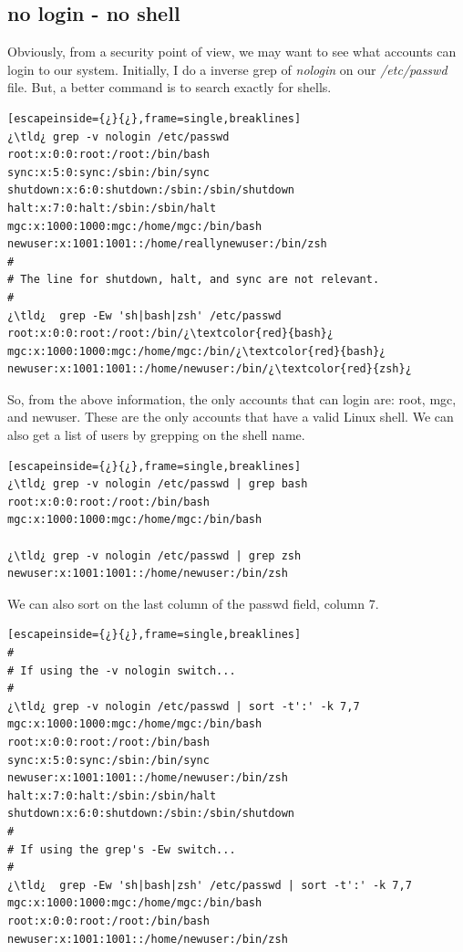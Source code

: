 \subsection{no login - no shell}
Obviously, from a security point of view, we may want to see what accounts can login to our system. Initially, I  do a inverse grep of \emph{nologin} on our \textsl{/etc/passwd} file. But, a better command is to search exactly for shells.

\begin{lstlisting}[escapeinside={¿}{¿},frame=single,breaklines]
¿\tld¿ grep -v nologin /etc/passwd
root:x:0:0:root:/root:/bin/bash
sync:x:5:0:sync:/sbin:/bin/sync
shutdown:x:6:0:shutdown:/sbin:/sbin/shutdown
halt:x:7:0:halt:/sbin:/sbin/halt
mgc:x:1000:1000:mgc:/home/mgc:/bin/bash
newuser:x:1001:1001::/home/reallynewuser:/bin/zsh
#
# The line for shutdown, halt, and sync are not relevant.
#
¿\tld¿  grep -Ew 'sh|bash|zsh' /etc/passwd
root:x:0:0:root:/root:/bin/¿\textcolor{red}{bash}¿
mgc:x:1000:1000:mgc:/home/mgc:/bin/¿\textcolor{red}{bash}¿
newuser:x:1001:1001::/home/newuser:/bin/¿\textcolor{red}{zsh}¿
\end{lstlisting}

So, from the above information, the only accounts that can login are: root, mgc, and newuser. These are the only accounts that have a valid Linux shell. We can also get a list of users by grepping on the shell name.

\begin{lstlisting}[escapeinside={¿}{¿},frame=single,breaklines]
¿\tld¿ grep -v nologin /etc/passwd | grep bash
root:x:0:0:root:/root:/bin/bash
mgc:x:1000:1000:mgc:/home/mgc:/bin/bash

¿\tld¿ grep -v nologin /etc/passwd | grep zsh
newuser:x:1001:1001::/home/newuser:/bin/zsh
\end{lstlisting}

We can also sort on the last column of the passwd field, column 7.

\begin{lstlisting}[escapeinside={¿}{¿},frame=single,breaklines]
#
# If using the -v nologin switch...
#
¿\tld¿ grep -v nologin /etc/passwd | sort -t':' -k 7,7
mgc:x:1000:1000:mgc:/home/mgc:/bin/bash
root:x:0:0:root:/root:/bin/bash
sync:x:5:0:sync:/sbin:/bin/sync
newuser:x:1001:1001::/home/newuser:/bin/zsh
halt:x:7:0:halt:/sbin:/sbin/halt
shutdown:x:6:0:shutdown:/sbin:/sbin/shutdown
#
# If using the grep's -Ew switch...
#
¿\tld¿  grep -Ew 'sh|bash|zsh' /etc/passwd | sort -t':' -k 7,7
mgc:x:1000:1000:mgc:/home/mgc:/bin/bash
root:x:0:0:root:/root:/bin/bash
newuser:x:1001:1001::/home/newuser:/bin/zsh
\end{lstlisting}

